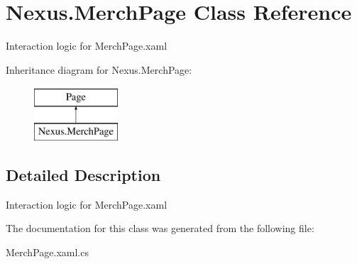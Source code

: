 \hypertarget{class_nexus_1_1_merch_page}{}\section{Nexus.\+Merch\+Page Class Reference}
\label{class_nexus_1_1_merch_page}


Interaction logic for Merch\+Page.\+xaml  


Inheritance diagram for Nexus.\+Merch\+Page\+:\begin{figure}[H]
\begin{center}
\leavevmode
\includegraphics[height=2.000000cm]{class_nexus_1_1_merch_page}
\end{center}
\end{figure}


\subsection{Detailed Description}
Interaction logic for Merch\+Page.\+xaml 



The documentation for this class was generated from the following file\+:\begin{DoxyCompactItemize}
\item 
Merch\+Page.\+xaml.\+cs\end{DoxyCompactItemize}
